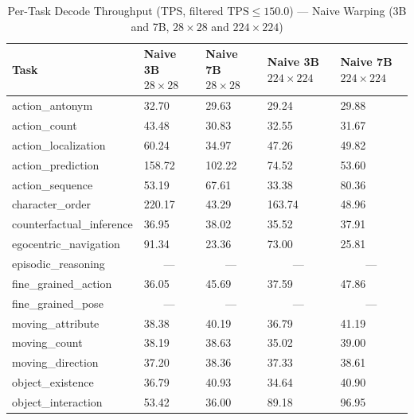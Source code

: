 \documentclass[conference]{IEEEtran}
\begin{document}
\begin{table}[!t]
  \centering
  \def\arraystretch{1.18}
  \caption{Per-Task Decode Throughput (TPS, filtered $\text{TPS} \leq 150.0$) --- Naive Warping (3B and 7B, $28{\times}28$ and $224{\times}224$)}
  \label{tab:naive_tps}
  \begin{tabularx}{\textwidth}{>{\raggedright\arraybackslash}p{4.5cm} YYYY}
    \toprule
    \textbf{Task}
      & \textbf{Naive 3B $28{\times}28$}
      & \textbf{Naive 7B $28{\times}28$}
      & \textbf{Naive 3B $224{\times}224$}
      & \textbf{Naive 7B $224{\times}224$} \\
    \midrule
    action\_antonym            & 32.70  & 29.63  & 29.24  & 29.88  \\
    action\_count              & 43.48  & 30.83  & 32.55  & 31.67  \\
    action\_localization       & 60.24  & 34.97  & 47.26  & 49.82  \\
    action\_prediction         & 158.72 & 102.22 & 74.52  & 53.60  \\
    action\_sequence           & 53.19  & 67.61  & 33.38  & 80.36  \\
    \addlinespace
    character\_order           & 220.17 & 43.29  & 163.74 & 48.96  \\
    counterfactual\_inference  & 36.95  & 38.02  & 35.52  & 37.91  \\
    egocentric\_navigation     & 91.34  & 23.36  & 73.00  & 25.81  \\
    episodic\_reasoning        &  &  &  &  \\
    fine\_grained\_action      & 36.05  & 45.69  & 37.59  & 47.86  \\
    \addlinespace
    fine\_grained\_pose        &  &  &  &  \\
    moving\_attribute          & 38.38  & 40.19  & 36.79  & 41.19  \\
    moving\_count              & 38.19  & 38.63  & 35.02  & 39.00  \\
    moving\_direction          & 37.20  & 38.36  & 37.33  & 38.61  \\
    object\_existence          & 36.79  & 40.93  & 34.64  & 40.90  \\
    \addlinespace
    object\_interaction        & 53.42  & 36.00  & 89.18  & 96.95  \\

\end{tabularx}
\end{table}
\end{document}
